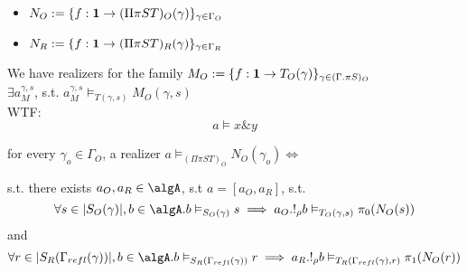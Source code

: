 \documentclass[12pt,a4paper]{article}
\def\rfl{_{refl}}\alwaysmath{rfl}
\renewcommand{\O}{_{O}}
\newcommand{\R}{\ensuremath{_{R}}}
\begin{document}
%
%
%
%

\begin{itemize}[noitemsep]
  \item $N\O \define \{f : \mathbf{1} \to (\Pi\pi S T)\O(\gamma) \}_{\gamma \in \Gamma\O}$
  \item $N\R \define \{f : \mathbf{1} \to (\Pi\pi S T)\R(\gamma) \}_{\gamma \in \Gamma\R}$
\end{itemize}
We have realizers for the family $M\O \define \{f : \mathbf{1} \to T\O(\gamma) \}_{\gamma \in (\Gamma.\pi S)\O}$\\
$\exists a_M^{\gamma, s}$, s.t. $a_M^{\gamma, s} \vDash_{T(\gamma,s)} M\O(\gamma,s)$\\
WTF:\\

$$ a \vDash x \& y$$

for every $\gamma_o \in \Gamma_O$, a realizer $a \vDash_{(\Pi\pi S T)\O} N\O(\gamma_o) \iff$

s.t. there exists $a\O, a\R \in \algA$, s.t $ a = [a\O, a\R]$, s.t.
$$\forall s \in \carr{S\O(\gamma)}, b \in \algA . b \vDash_{S\O(\gamma)} s \implies a\O . !_\rho b \vDash_{T\O(\gamma,s)} \pi_0(N\O(s))$$ and 
$$\forall r \in \carr{S\R(\Gamma\rfl(\gamma))}, b \in \algA . b \vDash_{S\R(\Gamma\rfl(\gamma))} r \implies a\R . !_\rho b \vDash_{T\R(\Gamma\rfl(\gamma),r)} \pi_1(N\O(r))$$ 
\end{document}
